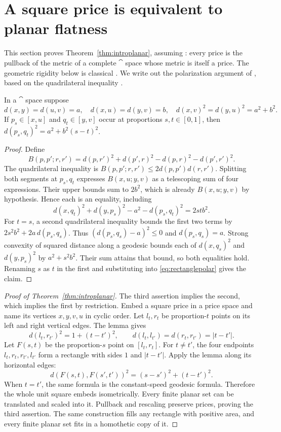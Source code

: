 \section{A square price is equivalent to planar flatness}
\label{sec:planar}

This section proves Theorem~\ref{thm:introplanar}, assuming
\cite[Proposition C.3, p.~28]{Anthropic2026}: every price is the
pullback of the metric of a complete $\cat$ space whose metric is
itself a price. The geometric rigidity below is classical
\cite[II.2.11]{BH1999}. We write out the polarization argument of
\cite[Lemma C.4(f), pp.~29, 65]{Anthropic2026}, based on the
quadrilateral inequality \cite{BN2008}.

\begin{lemma}\label{lem:rectangle}
In a $\cat$ space suppose
\[
 d(x,y)=d(u,v)=a,\quad d(x,u)=d(y,v)=b,\quad
 d(x,v)^2=d(y,u)^2=a^2+b^2.
\]
If $p_s\in[x,u]$ and $q_t\in[y,v]$ occur at proportions
$s,t\in[0,1]$, then
$d(p_s,q_t)^2=a^2+b^2(s-t)^2$.
\end{lemma}

\begin{proof}
Define
\[
 B(p,p';r,r')=
 d(p,r')^2+d(p',r)^2-d(p,r)^2-d(p',r')^2.
\]
The quadrilateral inequality is
$B(p,p';r,r')\le2d(p,p')d(r,r')$.
Splitting both segments at $p_s,q_t$ expresses
$B(x,u;y,v)$ as a telescoping sum of four expressions.
Their upper bounds sum to $2b^2$, which is already
$B(x,u;y,v)$ by hypothesis. Hence each is an equality, including
\begin{equation}\label{eq:rectanglepolar}
 d(x,q_t)^2+d(y,p_s)^2-a^2-d(p_s,q_t)^2=2stb^2.
\end{equation}
For $t=s$, a second quadrilateral inequality bounds the first two
terms by $2s^2b^2+2a\,d(p_s,q_s)$. Thus
$(d(p_s,q_s)-a)^2\le0$ and $d(p_s,q_s)=a$.
Strong convexity of squared distance along a geodesic bounds each
of $d(x,q_s)^2$ and $d(y,p_s)^2$ by $a^2+s^2b^2$.
Their sum attains that bound, so both equalities hold.
Renaming $s$ as $t$ in the first and substituting into
\eqref{eq:rectanglepolar} gives the claim.
\end{proof}

\begin{proof}[Proof of Theorem~\ref{thm:introplanar}]
The third assertion implies the second, which implies the first
by restriction. Embed a square price in a price space and name
its vertices $x,y,v,u$ in cyclic order.
Let $l_t,r_t$ be proportion-$t$ points on its left and right
vertical edges. The lemma gives
\[
 d(l_t,r_{t'})^2=1+(t-t')^2,\qquad
 d(l_t,l_{t'})=d(r_t,r_{t'})=|t-t'|.
\]
Let $F(s,t)$ be the proportion-$s$ point on $[l_t,r_t]$.
For $t\ne t'$, the four endpoints
$l_t,r_t,r_{t'},l_{t'}$ form a rectangle with sides $1$ and
$|t-t'|$. Apply the lemma along its horizontal edges:
\[
 d(F(s,t),F(s',t'))^2=(s-s')^2+(t-t')^2.
\]
When $t=t'$, the same formula is the constant-speed geodesic
formula. Therefore the whole unit square embeds isometrically.
Every finite planar set can be translated and scaled into it.
Pullback and rescaling preserve prices, proving the third assertion.
The same construction fills any rectangle with positive area,
and every finite planar set fits in a homothetic copy of it.
\end{proof}

